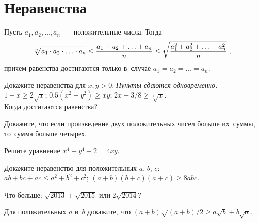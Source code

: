 
\section*{Неравенства}





Пусть $a_1, a_2, \ldots, a_n$~--- положительные числа.
Тогда
\[
    \sqrt[n]{\mathstrut
        a_1 \cdot a_2 \cdot \ldots \cdot a_n
    }
\leq
    \frac{
        a_1 + a_2 + \ldots + a_n
    }{n}
\leq
    \sqrt{\frac{
        a_1^2 + a_2^2 + \ldots + a_n^2
    }{n}}
\;,\]
причем равенства достигаются только в~случае $a_1 = a_2 = \ldots = a_n$.

\begin{problems}

\item
Докажите неравенства для $x, y > 0$.
\emph{Пункты сдаются одновременно.}
\\[0.25ex]
\sp $1 + x \geq 2 \sqrt{x}$;
\quad
\sp $0.5 (x^2 + y^2) \geq x y$;
\quad
\sp $2 x + 3 / 8 \geq \sqrt[4]{x}$.
\\[0.25ex]
Когда достигаются равенства?

\item
Докажите, что если произведение двух положительных чисел больше их~суммы,
то~сумма больше четырех.

\item
Решите уравнение\enspace
$x^4 + y^4 + 2 = 4 x y$.

\item
Докажите неравенство для положительных $a$, $b$, $c$:
\\[0.3ex]
\sp $a b + b c + a c \leq a^2 + b^2 + c^2$;
\qquad
\sp $(a + b) (b + c) (a + c) \geq 8 a b c$.

\item
Что больше:\enspace
$\sqrt{2013} + \sqrt{2015}$\enspace
или\enspace
$2 \sqrt{2014}$?

\item
Для положительных $a$ и~$b$ докажите, что\enspace
\(
    (a + b) \sqrt{(a + b) / 2}
\geq
    a \sqrt{b} + b \sqrt{a}
.\)

\end{problems}

